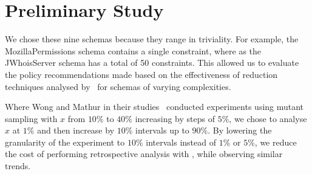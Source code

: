 \section{Preliminary Study}




We chose these nine schemas because they range in triviality. For example, the MozillaPermissions schema contains a
single constraint, where as the JWhoisServer schema has a total of 50 constraints. This allowed us to evaluate the
policy recommendations made based on the effectiveness of reduction techniques analysed by \mr~for schemas of varying
complexities.

Where Wong and Mathur in their studies~\cite{mathur1994empirical, wong1993mutation} conducted experiments using mutant
sampling with $x$ from $10\%$ to $40\%$ increasing by steps of $5\%$, we chose to analyse $x$ at $1\%$ and then increase
by $10\%$ intervals up to $90\%$. By lowering the granularity of the experiment to $10\%$ intervals instead of $1\%$ or
$5\%$, we reduce the cost of performing retrospective analysis with \mr, while observing similar trends.

